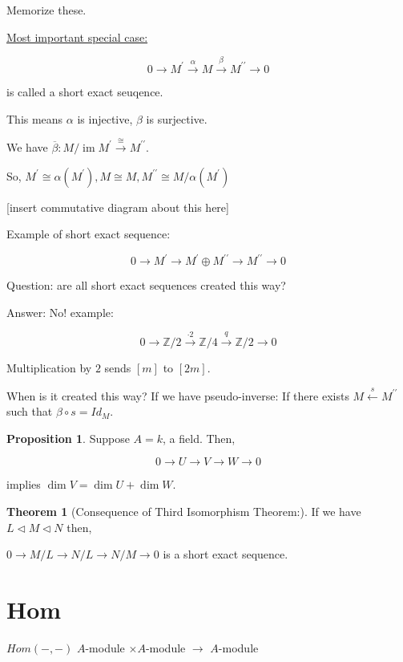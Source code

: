 \documentclass{article}
\theoremstyle{definition}
\newtheorem{theorem}{Theorem}
\newtheorem{proposition}{Proposition}
\newcommand{\im}{\operatorname{im}}
\begin{document}
Memorize these.

\underline{Most important special case:}

\[
    0 \to M^{\prime} \overset{\alpha}{\to} M \overset{\beta}{\to}  M^{\prime\prime} \to 0
\]

is called a short exact seuqence.

This means \(\alpha \) is injective, \(\beta\) is surjective.

We have \(\overline{\beta} : M / \im M^{\prime} \overset{\cong}{\to} M^{\prime\prime}\).

So, \(M^{\prime} \cong \alpha (M^{\prime} ), M\cong M, M^{\prime\prime} \cong M / \alpha (M^{\prime})\) 

[insert commutative diagram about this here]

Example of short exact sequence:

\[
    0 \to M^{\prime} \to M^{\prime} \oplus M^{\prime\prime} \to M^{\prime\prime} \to 0
\]

Question: are all short exact sequences created this way?

Answer: No! example:

\[
    0 \to \mathbb{Z} / 2 \overset{\cdot 2}{\to} \mathbb{Z} / 4 \overset{q}{\to} \mathbb{Z} / 2 \to 0
\]

Multiplication by \(2\) sends \([m]\) to \([2m]\).

When is it created this way? If we have pseudo-inverse: If there exists \(M \overset{s}{\leftarrow} M^{\prime\prime}\) such that \(\beta \circ s = Id_M\).

\begin{proposition}
    Suppose \(A = k\), a field. Then,

    \[
        0 \to U \to V \to W \to 0
    \]

    implies \(\dim V = \dim U + \dim W\).
\end{proposition}

\begin{theorem}
    [Consequence of Third Isomorphism Theorem:] If we have \(L \triangleleft M \triangleleft N\) then,
    
    \(0 \to M / L \to N / L \to N / M \to 0\) is a short exact sequence.
\end{theorem}

\section*{Hom}

\(Hom(-,-)\) \(A\)-module \(\times A\)-module \(\to\) \(A\)-module
\end{document}
